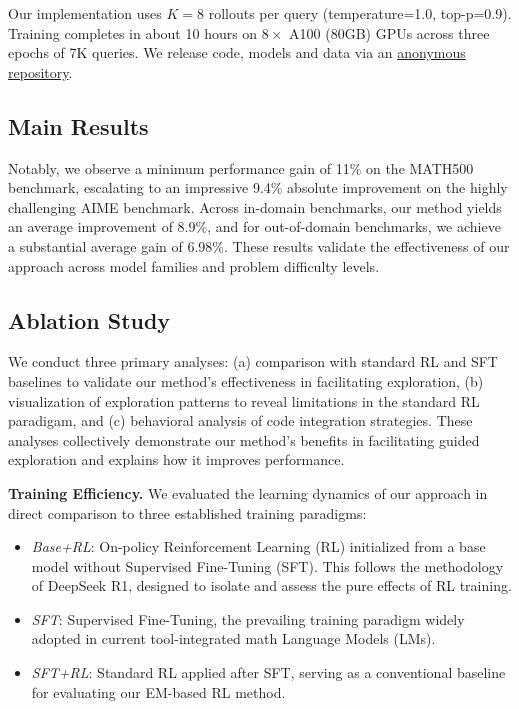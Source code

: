 Our implementation uses \( K = 8 \) rollouts per query (temperature=1.0, top-p=0.9). Training completes in about 10 hours on \(8\times\) A100 (80GB) GPUs across three epochs of 7K queries. We release code, models and data via an \href{https://anonymous.4open.science/r/AnnonySubmission-0C62}{anonymous repository}.

\subsection{Main Results}\label{sec_main}
Notably, we observe a minimum performance gain of 11\% on the MATH500 benchmark, escalating to an impressive 9.4\% absolute improvement on the highly challenging AIME benchmark.  Across in-domain benchmarks, our method yields an average improvement of 8.9\%, and for out-of-domain benchmarks, we achieve a substantial average gain of 6.98\%. These results  validate the effectiveness of our approach across model families and problem difficulty levels.  

\subsection{Ablation Study}\label{sec_ablation}
We conduct three primary analyses: (a) comparison with standard RL and SFT baselines to validate our method's effectiveness in facilitating exploration, (b) visualization of exploration patterns to reveal limitations in the standard RL paradigam, and (c) behavioral analysis of code integration strategies. These analyses collectively demonstrate our method's benefits in facilitating guided exploration and explains how it improves performance.


\noindent\textbf{Training Efficiency.} We evaluated the learning dynamics of our approach in direct comparison to three established training paradigms:
\begin{itemize}[leftmargin=0.5cm,itemsep=0pt,parsep=0pt]
\item \emph{Base+RL}:  On-policy Reinforcement Learning (RL) initialized from a base model without Supervised Fine-Tuning (SFT). This follows the methodology of DeepSeek R1, designed to isolate and assess the pure effects of RL training.
\item \emph{SFT}: Supervised Fine-Tuning, the prevailing training paradigm widely adopted in current tool-integrated math Language Models (LMs).
\item \emph{SFT+RL}: Standard RL applied after SFT, serving as a conventional baseline for evaluating our EM-based RL method.
\end{itemize}

